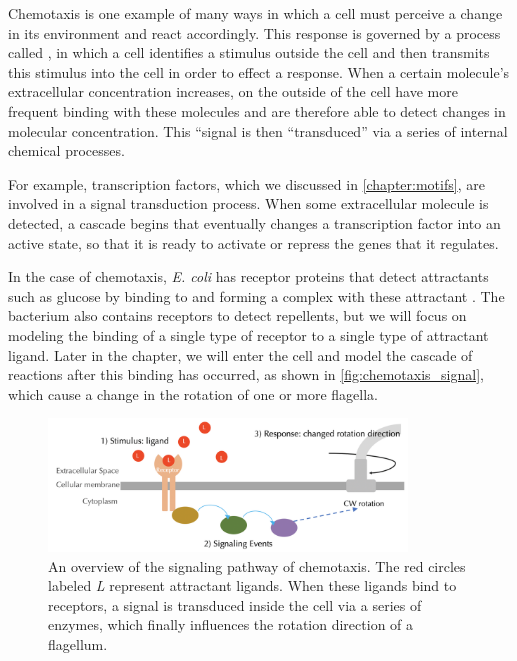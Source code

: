 Chemotaxis is one example of many ways in which a cell must perceive a change in its environment and react accordingly. This response is governed by a process called , in which a cell identifies a stimulus outside the cell and then transmits this stimulus into the cell in order to effect a response. When a certain molecule's extracellular concentration increases,  on the outside of the cell have more frequent binding with these molecules and are therefore able to detect changes in molecular concentration. This ``signal is then ``transduced'' via a series of internal chemical processes.

For example, transcription factors, which we discussed in \autoref{chapter:motifs}, are involved in a signal transduction process. When some extracellular molecule is detected, a cascade begins that eventually changes a transcription factor into an active state, so that it is ready to activate or repress the genes that it regulates.

In the case of chemotaxis, \textit{E. coli} has receptor proteins that detect attractants such as glucose by binding to and forming a complex with these attractant . The bacterium also contains receptors to detect repellents, but we will focus on modeling the binding of a single type of receptor to a single type of attractant ligand. Later in the chapter, we will enter the cell and model the cascade of reactions after this binding has occurred, as shown in \autoref{fig:chemotaxis_signal}, which cause a change in the rotation of one or more flagella.

\begin{figure}[h]
\centering
\mySfFamily
\includegraphics[width = 0.85\textwidth]{../images/chemotaxis_signal.png}
\caption{An overview of the signaling pathway of chemotaxis. The red circles labeled \textit{L} represent attractant ligands. When these ligands bind to receptors, a signal is transduced inside the cell via a series of enzymes, which finally influences the rotation direction of a flagellum.}
\label{fig:chemotaxis_signal}
\end{figure}

